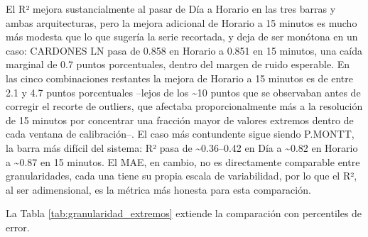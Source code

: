 El R² mejora sustancialmente al pasar de Día a Horario en las tres barras y ambas arquitecturas, pero la mejora adicional de Horario a 15 minutos es mucho más modesta que lo que sugería la serie recortada, y deja de ser monótona en un caso: CARDONES LN pasa de 0.858 en Horario a 0.851 en 15 minutos, una caída marginal de 0.7 puntos porcentuales, dentro del margen de ruido esperable. En las cinco combinaciones restantes la mejora de Horario a 15 minutos es de entre 2.1 y 4.7 puntos porcentuales --lejos de los \textasciitilde10 puntos que se observaban antes de corregir el recorte de outliers, que afectaba proporcionalmente más a la resolución de 15 minutos por concentrar una fracción mayor de valores extremos dentro de cada ventana de calibración--. El caso más contundente sigue siendo P.MONTT, la barra más difícil del sistema: R² pasa de \textasciitilde0.36--0.42 en Día a \textasciitilde0.82 en Horario a \textasciitilde0.87 en 15 minutos. El MAE, en cambio, no es directamente comparable entre granularidades, cada una tiene su propia escala de variabilidad, por lo que el R², al ser adimensional, es la métrica más honesta para esta comparación.

La Tabla \ref{tab:granularidad_extremos} extiende la comparación con percentiles de error.

